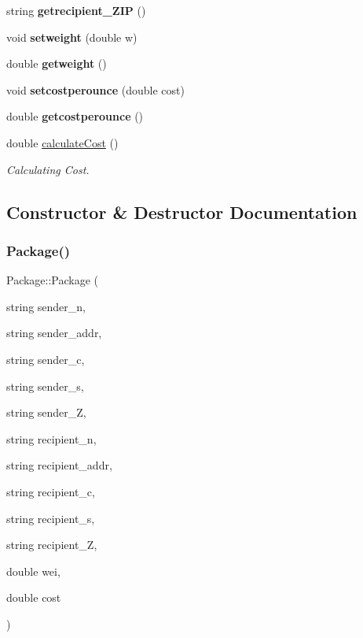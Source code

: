 \begin{DoxyCompactItemize}
\mbox{\label{class_package_a6943b57b109b1c185aab93e6c0ad8c1d}} 
string {\bfseries getrecipient\+\_\+\+Z\+IP} ()
\item 
\mbox{\label{class_package_a2734b7fd507a259f34b6ae7a42044cc5}} 
void {\bfseries setweight} (double w)
\item 
\mbox{\label{class_package_a794c750fbdc0a0bbf051ef84ff155256}} 
double {\bfseries getweight} ()
\item 
\mbox{\label{class_package_acce59769e49209f03205a21057bb27c0}} 
void {\bfseries setcostperounce} (double cost)
\item 
\mbox{\label{class_package_a8b292251f4b91f04ec7752a0f4bf253c}} 
double {\bfseries getcostperounce} ()
\item 
\mbox{\label{class_package_a39e17c4cb7f41b9e4501d1a88a57e862}} 
double \mbox{\hyperlink{class_package_a39e17c4cb7f41b9e4501d1a88a57e862}{calculate\+Cost}} ()
\begin{DoxyCompactList}\small\item\em Calculating Cost. \end{DoxyCompactList}\end{DoxyCompactItemize}


\subsection{Constructor \& Destructor Documentation}
\mbox{\label{class_package_a3b3ccbce09176e6c7acb16906bfe0fce}} 
\subsubsection{\texorpdfstring{Package()}{Package()}}
{\footnotesize\ttfamily Package\+::\+Package (\begin{DoxyParamCaption}\item[{string}]{sender\+\_\+n,  }\item[{string}]{sender\+\_\+addr,  }\item[{string}]{sender\+\_\+c,  }\item[{string}]{sender\+\_\+s,  }\item[{string}]{sender\+\_\+Z,  }\item[{string}]{recipient\+\_\+n,  }\item[{string}]{recipient\+\_\+addr,  }\item[{string}]{recipient\+\_\+c,  }\item[{string}]{recipient\+\_\+s,  }\item[{string}]{recipient\+\_\+Z,  }\item[{double}]{wei,  }\item[{double}]{cost }\end{DoxyParamCaption})}



